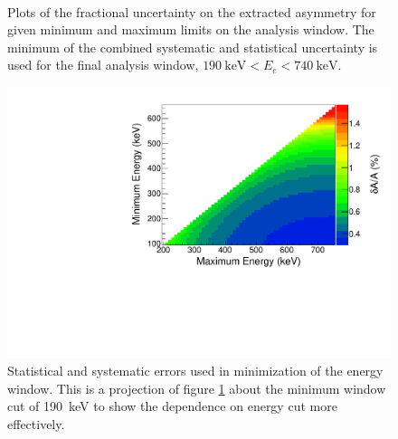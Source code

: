 \begin{figure}[p]
   \\ 
  \caption{Plots of the fractional uncertainty on the extracted asymmetry for given minimum and maximum limits
    on the analysis window. The minimum of the combined systematic and statistical uncertainty is used for the
  final analysis window, $190\mathrm{~keV} < E_e < 740\mathrm{~keV}$.}
  \label{fig:enWindow}
\end{figure}


\begin{figure}[H]
\centering
\includegraphics[page=5,scale=.5]{5-UCNAResults/TwoDimUncert.pdf}
\caption{Statistical and systematic errors used in minimization of the energy window. This is a projection
  of figure \ref{fig:enWindow} about the minimum window cut of 190~keV to show the dependence on energy cut
  more effectively.}
\label{fig:enWindow1D}
\end{figure}

